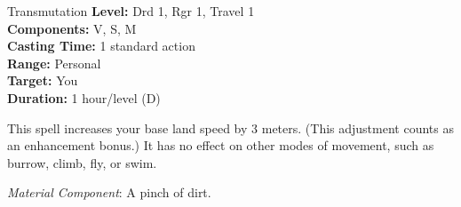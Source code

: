 {Transmutation}
{
	\textbf{Level:}
	Drd 1, Rgr 1, Travel 1\\
	\textbf{Components:}
	V, S, M\\
	\textbf{Casting Time:}
	1 standard action\\
	\textbf{Range:}
	Personal\\
	\textbf{Target:}
	You\\
	\textbf{Duration:}
	1 hour/level (D)\\
}
{
	This spell increases your base land speed by 3 meters. (This adjustment counts as an enhancement bonus.) It has no effect on other modes of movement, such as burrow, climb, fly, or swim.

	\textit{Material Component}:
	A pinch of dirt.

}
